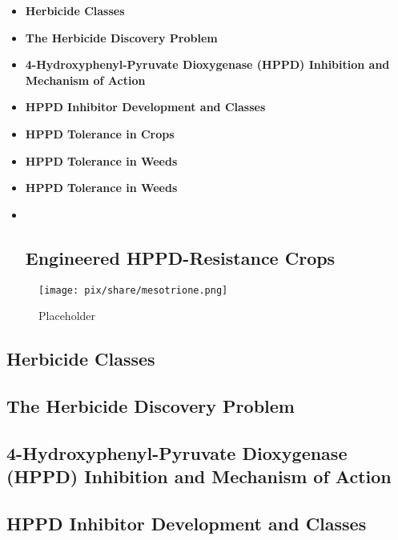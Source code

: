\begin{itemize}
\item
  \textbf{Herbicide Classes}
\item
  \textbf{The Herbicide Discovery Problem}
\item
  \textbf{4-Hydroxyphenyl-Pyruvate Dioxygenase (HPPD) Inhibition and
  Mechanism of Action}
\item
  \textbf{HPPD Inhibitor Development and Classes}
\item
  \textbf{HPPD Tolerance in Crops}
\item
  \textbf{HPPD Tolerance in Weeds}
\item
  \textbf{HPPD Tolerance in Weeds}
\item ~
  \hypertarget{engineered-hppd-resistance-crops}{%
  \subsection{\texorpdfstring{\textbf{Engineered HPPD-Resistance
  Crops}}{Engineered HPPD-Resistance Crops}}\label{engineered-hppd-resistance-crops}}
\end{itemize}

\begin{figure}
\centering
\texttt{[image: pix/share/mesotrione.png]}
\caption{Placeholder}
\end{figure}

\hypertarget{herbicide-classes}{%
\subsection{Herbicide Classes}\label{herbicide-classes}}

\hypertarget{the-herbicide-discovery-problem}{%
\subsection{The Herbicide Discovery
Problem}\label{the-herbicide-discovery-problem}}

\hypertarget{hydroxyphenyl-pyruvate-dioxygenase-hppd-inhibition-and-mechanism-of-action}{%
\subsection{4-Hydroxyphenyl-Pyruvate Dioxygenase (HPPD) Inhibition and
Mechanism of
Action}\label{hydroxyphenyl-pyruvate-dioxygenase-hppd-inhibition-and-mechanism-of-action}}

\hypertarget{hppd-inhibitor-development-and-classes}{%
\subsection{HPPD Inhibitor Development and
Classes}\label{hppd-inhibitor-development-and-classes}}

